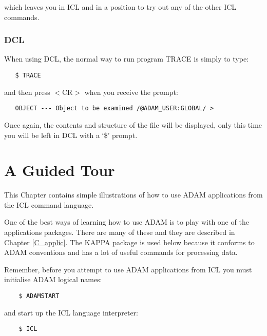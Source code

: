 which leaves you in ICL and in a position to try out any of the other ICL
commands.

\subsection{DCL}

When using DCL, the normal way to run program TRACE is simply to type:

\begin{small}
\begin{verbatim}
   $ TRACE
\end{verbatim}
\end{small}

and then press $<$CR$>$ when you receive the prompt:

\begin{small}
\begin{verbatim}
   OBJECT --- Object to be examined /@ADAM_USER:GLOBAL/ >
\end{verbatim}
\end{small}

Once again, the contents and structure of the file will be displayed, only this
time you will be left in DCL with a `\$' prompt.

\chapter {A Guided Tour}
\label{C_tour}

This Chapter contains simple illustrations of how to use ADAM applications from
the ICL command language.

One of the best ways of learning how to use ADAM is to play with one of the
applications packages.
There are many of these and they are described in Chapter \ref{C_applic}.
The KAPPA package is used below because it conforms to ADAM conventions and
has a lot of useful commands for processing data.

Remember, before you attempt to use ADAM applications from ICL you must
initialise ADAM logical names:

\begin{small}
\begin{verbatim}
    $ ADAMSTART
\end{verbatim}
\end{small}

and start up the ICL language interpreter:

\begin{small}
\begin{verbatim}
    $ ICL
\end{verbatim}
\end{small}


